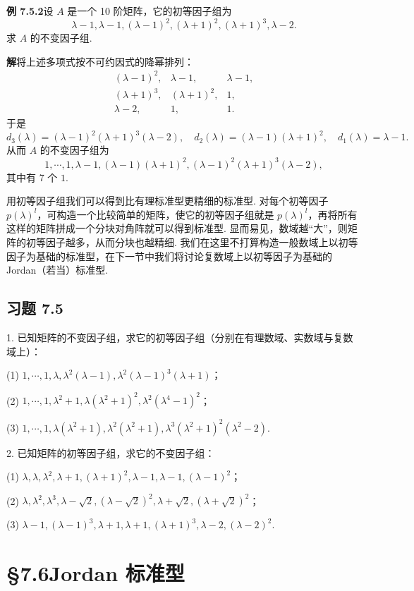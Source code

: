 \documentclass[UTF8,12pt,a4paper,fontset=fandol]{ctexart}
\begin{document}
\noindent\textbf{例 7.5.2}\quad 设 $A$ 是一个 10 阶矩阵，它的初等因子组为
\[
\lambda-1,\lambda-1,(\lambda-1)^2,(\lambda+1)^2,(\lambda+1)^3,\lambda-2.
\]
求 $A$ 的不变因子组.

\noindent\textbf{解}\quad 将上述多项式按不可约因式的降幂排列：
\[
\begin{array}{ccc}
(\lambda-1)^2, & \lambda-1, & \lambda-1,\\
(\lambda+1)^3, & (\lambda+1)^2, & 1,\\
\lambda-2, & 1, & 1.
\end{array}
\]
于是
\[
d_3(\lambda)=(\lambda-1)^2(\lambda+1)^3(\lambda-2),\quad
d_2(\lambda)=(\lambda-1)(\lambda+1)^2,\quad
d_1(\lambda)=\lambda-1.
\]
从而 $A$ 的不变因子组为
\[
1,\cdots,1,\lambda-1,(\lambda-1)(\lambda+1)^2,(\lambda-1)^2(\lambda+1)^3(\lambda-2),
\]
其中有 7 个 $1$.

用初等因子组我们可以得到比有理标准型更精细的标准型. 对每个初等因子 $p(\lambda)^l$，可构造一个比较简单的矩阵，使它的初等因子组就是 $p(\lambda)^l$，再将所有这样的矩阵拼成一个分块对角阵就可以得到标准型. 显而易见，数域越“大”，则矩阵的初等因子越多，从而分块也越精细. 我们在这里不打算构造一般数域上以初等因子为基础的标准型，在下一节中我们将讨论复数域上以初等因子为基础的 Jordan（若当）标准型.

\subsection*{习题 7.5}

1. 已知矩阵的不变因子组，求它的初等因子组（分别在有理数域、实数域与复数域上）：

(1) $1,\cdots,1,\lambda,\lambda^2(\lambda-1),\lambda^2(\lambda-1)^3(\lambda+1)$；

(2) $1,\cdots,1,\lambda^2+1,\lambda(\lambda^2+1)^2,\lambda^2(\lambda^4-1)^2$；

(3) $1,\cdots,1,\lambda(\lambda^2+1),\lambda^2(\lambda^2+1),\lambda^3(\lambda^2+1)^2(\lambda^2-2)$.

2. 已知矩阵的初等因子组，求它的不变因子组：

(1) $\lambda,\lambda,\lambda^2,\lambda+1,(\lambda+1)^2,\lambda-1,\lambda-1,(\lambda-1)^2$；

(2) $\lambda,\lambda^2,\lambda^3,\lambda-\sqrt{2},(\lambda-\sqrt{2})^2,\lambda+\sqrt{2},(\lambda+\sqrt{2})^2$；

(3) $\lambda-1,(\lambda-1)^3,\lambda+1,\lambda+1,(\lambda+1)^3,\lambda-2,(\lambda-2)^2$.

\section*{§7.6\quad Jordan 标准型}
\end{document}
